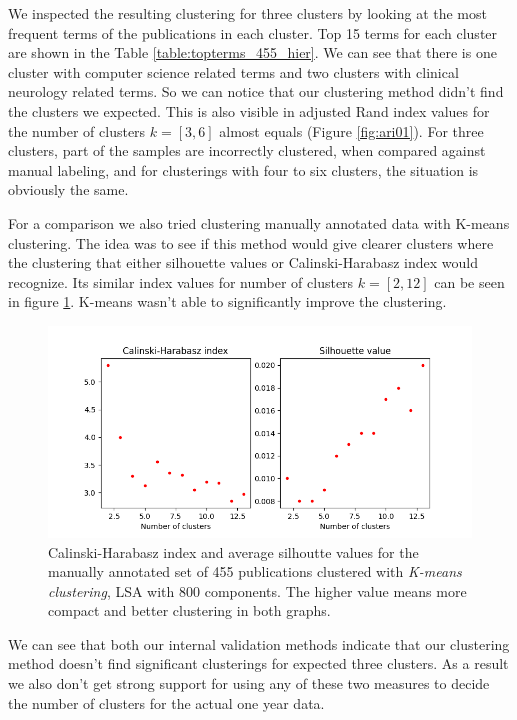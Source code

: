 We inspected the resulting clustering for three clusters by 
looking at the most frequent terms of the publications in each 
cluster. Top 15 terms for each cluster are shown in the Table 
\ref{table:topterms_455_hier}. We can see that there is one cluster
with computer science related terms and two clusters with clinical
neurology related terms. So we can notice that our clustering method
didn't find the clusters we expected. This is also visible in 
adjusted Rand index values for the number of clusters $k=[3,6]$ almost 
equals (Figure \ref{fig:ari01}). For three clusters, part of the 
samples are incorrectly clustered, when compared against manual
labeling, and for clusterings with four to six clusters, the 
situation is obviously the same.



For a comparison we also tried clustering manually annotated data
with K-means clustering. The idea was to see if this method would
give clearer clusters where the clustering that either silhouette values or 
Calinski-Harabasz index would recognize. Its similar
index values for number of clusters $k=[2,12]$ can be seen in 
figure \ref{fig:ch-silh02}. K-means wasn't able to significantly 
improve the clustering.

\begin{figure}[htp]
  \begin{center}    
\includegraphics[width=11.5cm]{images/c-h-silh-index-plot-455-2_12-800-kmeans.png}
    \caption{Calinski-Harabasz index and average silhoutte values for the
    manually annotated set of 455 publications clustered with 
    \emph{K-means clustering}, LSA with 800 components. The higher
    value means more compact and better clustering in both graphs.}
    \label{fig:ch-silh02}
  \end{center}
\end{figure}

We can see that both our internal validation methods indicate that
our clustering method doesn't find significant clusterings for
expected three clusters.
As a result we also don't get strong support for using any of 
these two measures to decide the number of clusters for the actual 
one year data.

